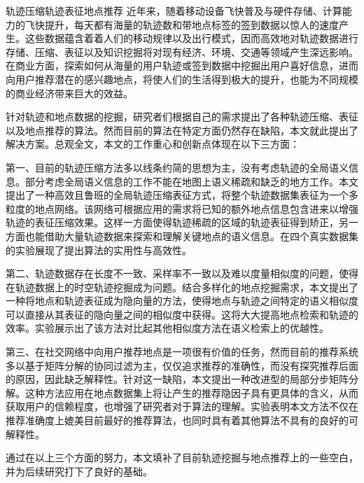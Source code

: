 
\begin{Cabstract}{轨迹压缩}{轨迹表征}{地点推荐}{}{}
近年来，随着移动设备飞快普及与硬件存储、计算能力的飞快提升，每天都有海量的轨迹数和带地点标签的签到数据以惊人的速度产生。这些数据蕴含着着人们的移动规律以及出行模式，因而高效地对轨迹数据进行存储、压缩、表征以及知识挖掘将对现有经济、环境、交通等领域产生深远影响。在商业方面，探索如何从海量的用户轨迹或签到数据中挖掘出用户喜好信息，进而向用户推荐潜在的感兴趣地点，将使人们的生活得到极大的提升，也能为不同规模的商业经济带来巨大的效益。

针对轨迹和地点数据的挖掘，研究者们根据自己的需求提出了各种轨迹压缩、表征以及地点推荐的算法。然而目前的算法在特定方面仍然存在缺陷，本文就此提出了解决方案。总观全文，本文的工作重心和创新点体现在以下三方面：

第一、目前的轨迹压缩方法多以线条约简的思想为主，没有考虑轨迹的全局语义信息。部分考虑全局语义信息的工作不能在地图上语义稀疏和缺乏的地方工作。本文提出了一种高效且鲁班的全局轨迹压缩表征方式，将整个轨迹数据集表征为一个多粒度的地点网络。该网络可根据应用的需求将已知的额外地点信息包含进来以增强轨迹的表征压缩效果。这样一方面使得轨迹稀疏的区域的轨迹表征得到矫正，另一方面也能借助大量轨迹数据来探索和理解关键地点的语义信息。在四个真实数据集的实验展现了提出算法的实用性与高效性。

第二、轨迹数据存在长度不一致、采样率不一致以及难以度量相似度的问题，使得在轨迹数据上的时空轨迹挖掘成为问题。结合多样化的地点挖掘需求，本文提出了一种将地点和轨迹表征成为隐向量的方法，使得地点与轨迹之间特定的语义相似度可以直接从其表征的隐向量之间的相似度中获得。这将大大提高地点检索和轨迹的效率。实验展示出了该方法对比起其他相似度方法在语义检索上的优越性。

第三、在社交网络中向用户推荐地点是一项很有价值的任务，然而目前的推荐系统多以基于矩阵分解的协同过滤为主，仅仅追求推荐的准确性，而没有探究推荐后面的原因，因此缺乏解释性。针对这一缺陷，本文提出一种改进型的局部分步矩阵分解。这种方法应用在地点数据集上将让产生的推荐隐因子具有更具体的含义，从而获取用户的信赖程度，也增强了研究者对于算法的理解。实验表明本文方法不仅在推荐准确度上媲美目前最好的推荐算法，也同时具有着其他算法不具有的良好的可解释性。

通过在以上三个方面的努力，本文填补了目前轨迹挖掘与地点推荐上的一些空白，并为后续研究打下了良好的基础。
\end{Cabstract}

